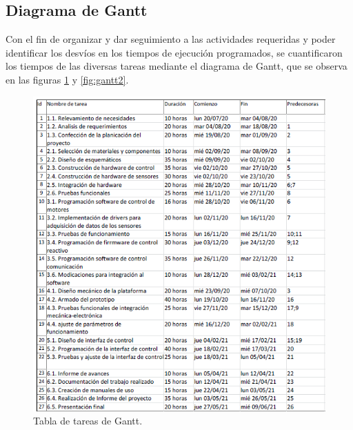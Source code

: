 \subsection{Diagrama de Gantt}
Con el fin de organizar y dar seguimiento a las actividades requeridas y poder identificar los desvíos en los tiempos de ejecución programados, se cuantificaron los tiempos de las diversas tareas mediante el diagrama de Gantt, que se observa en las figuras \ref{fig:gantt1} y \ref{fig:gantt2}.


\begin{figure}[htpb]
\centering 
\includegraphics[width=\textwidth]{./Figures/gantttabla.PNG}
\caption{Tabla de tareas de Gantt.}
\label{fig:gantt1}
\end{figure}

